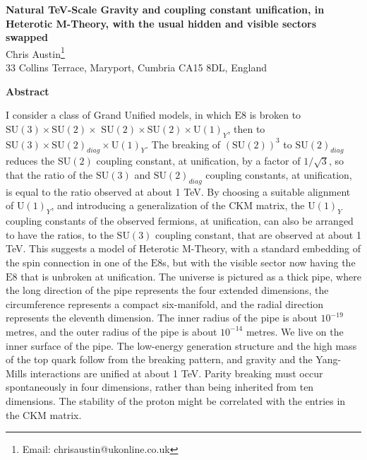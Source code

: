 \documentclass[a4paper,12pt,oneside]{article}
\begin{document}


\begin{center}
{\large\bf Natural TeV-Scale Gravity and coupling constant
unification, in Heterotic M-Theory, with the usual hidden and
visible sectors swapped\\}
\vspace{0.14cm}
\vspace*{.05in}
{Chris Austin\footnote{Email: chrisaustin@ukonline.co.uk}\\
\small 33 Collins Terrace, Maryport, Cumbria CA15 8DL, England\\
}
\end{center}
\begin{center}
{\bf Abstract}
\end{center}
\noindent I consider a class of Grand Unified models, in which 
$\mathrm{E}8$ is
broken to $\mathrm{SU}(3) \times \mathrm{SU}(2) \times$ 
$\mathrm{SU}(2) \times \mathrm{SU}(2) \times \mathrm{U}(1)_Y$, then 
to $\mathrm{SU}(3) \times \mathrm{SU}(2)_{diag} \times 
\mathrm{U}(1)_Y$.  The 
breaking of $(\mathrm{SU}(2))^3$ to 
$\mathrm{SU}(2)_{diag}$ reduces the $\mathrm{SU}(2)$ coupling
constant, at unification, by a factor of $1/\sqrt{3}$, so that the 
ratio of the
$\mathrm{SU}(3)$ and $\mathrm{SU}(2)_{diag}$ coupling constants, at
unification, is equal to the ratio observed at about 1 TeV.  By 
choosing a suitable alignment of $\mathrm{U}(1)_Y$, and introducing
a generalization of the CKM matrix, the
$\mathrm{U}(1)_Y$ coupling constants of the observed fermions, at
unification, can also be arranged to have the ratios, to the 
$\mathrm{SU}(3)$ coupling constant, that are observed at about
1 TeV.  This 
suggests a model of Heterotic M-Theory, with a standard embedding of
the spin connection in one of the $\mathrm{E}8$s, but with the 
visible sector now having the $\mathrm{E}8$ that is unbroken at 
unification.  The universe is pictured 
as a thick pipe, where the long direction of the pipe represents 
the four extended dimensions, the circumference represents a 
compact six-manifold, and the radial direction represents the 
eleventh 
dimension.  The inner radius of the pipe is about $10^{-19}$ 
metres, and the outer radius of the pipe is about $10^{-14}$ 
metres.  We live on the inner surface of the pipe.  The low-energy 
generation structure and the high mass of the top quark follow from
the breaking pattern, and gravity and the Yang-Mills interactions 
are unified at about 1 TeV.  Parity breaking must
occur spontaneously in four dimensions, rather than being inherited
from ten dimensions.  The stability of the proton might be 
correlated with the entries in the CKM matrix.
\end{document}
